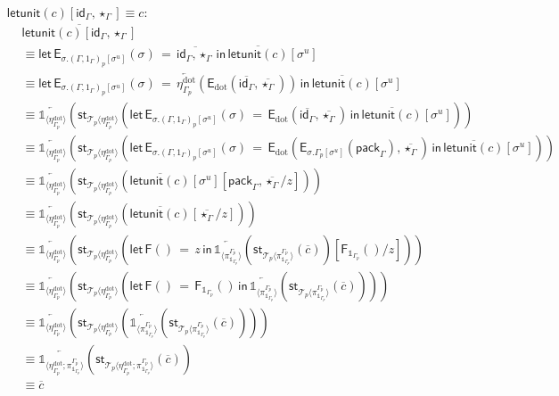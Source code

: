 \documentclass[10pt]{article}
\theoremstyle{definition}
\newcommand{\id}{\mathsf{id}}
\newcommand{\rewrite}[2]{\overleftarrow{#1}(#2)}
\newcommand\StI[2]{\ensuremath{\mathsf{st}_{#1}(#2)}}
\newcommand\FE[3]{\ensuremath{\mathsf{let} \, \mathsf{F}(#2) \, = \, {#1} \, \mathsf{in} \, #3}}
\newcommand\FIs[2]{\ensuremath{\mathsf{F}_{#1}{(#2)}}}
\newcommand\EEs[4]{\ensuremath{\mathsf{let} \, \mathsf{E}_{#1}(#3) \, = \, {#2} \, \mathsf{in} \, #4}}
\newcommand\EIs[2]{\ensuremath{\mathsf{E}_{#1}{(#2)}}}
\newcommand\ApEl[2]{\mathcal{T}_{#1}\langle#2\rangle}
\newcommand\pack[1]{\ensuremath{\mathsf{pack}_{#1}}}
\newcommand\unp[2]{\ensuremath{{#2}^u}}
\newcommand{\modeof}[1]{{#1}_p}
\newcommand{\sdot}{\ensuremath{\mathrm{dot}}}
\newcommand{\upstairs}[1]{\overline{#1}}
\newcommand\One{\ensuremath{\mathds{1}}}
\newcommand\ApOne[1]{\ensuremath{\One_{\langle {#1} \rangle }}}
\newcommand\qunitmatch[1]{\ensuremath{\mathsf{letunit}(#1)}}
\begin{document}
\begin{enumerate}[style = multiline, labelwidth = 80pt]
\item[{$\qunitmatch{c}[\id_\Gamma, \star_\Gamma] \equiv c$}:] 
\begin{align*}
&\upstairs{\qunitmatch{c}[\id_\Gamma, \star_\Gamma]} \\
&\equiv \EEs{\sigma.\modeof{(\Gamma, 1_\Gamma)}[\unp{\Gamma, 1_\Gamma}{\sigma}]}{\upstairs{\id_\Gamma, \star_\Gamma}}{\sigma}{\upstairs{\qunitmatch{c}}[\unp{\Gamma, 1_\Gamma}{\sigma}]} \\
&\equiv \EEs{\sigma.\modeof{(\Gamma, 1_\Gamma)}[\unp{\Gamma, 1_\Gamma}{\sigma}]}{\rewrite{\eta^\sdot_{\modeof{\Gamma}}}{\EIs{\sdot}{\upstairs{\id_\Gamma}, \upstairs{\star_\Gamma}}}}{\sigma}{\upstairs{\qunitmatch{c}}[\unp{\Gamma, 1_\Gamma}{\sigma}]} \\
&\equiv \rewrite{\ApOne{\eta^\sdot_{\modeof{\Gamma}}}}{\StI{\ApEl{p}{\eta^\sdot_{\modeof{\Gamma}}}}{\EEs{\sigma.\modeof{(\Gamma, 1_\Gamma)}[\unp{\Gamma, 1_\Gamma}{\sigma}]}{\EIs{\sdot}{\upstairs{\id_\Gamma}, \upstairs{\star_\Gamma}}}{\sigma}{\upstairs{\qunitmatch{c}}[\unp{\Gamma, 1_\Gamma}{\sigma}]}}} \\
&\equiv \rewrite{\ApOne{\eta^\sdot_{\modeof{\Gamma}}}}{\StI{\ApEl{p}{\eta^\sdot_{\modeof{\Gamma}}}}{\EEs{\sigma.\modeof{(\Gamma, 1_\Gamma)}[\unp{\Gamma, 1_\Gamma}{\sigma}]}{\EIs{\sdot}{\EIs{\sigma.\modeof{\Gamma}[\unp{\Gamma}{\sigma}]}{\pack{\Gamma}}, \upstairs{\star_\Gamma}}}{\sigma}{\upstairs{\qunitmatch{c}}[\unp{\Gamma, 1_\Gamma}{\sigma}]}}} \\
&\equiv \rewrite{\ApOne{\eta^\sdot_{\modeof{\Gamma}}}}{\StI{\ApEl{p}{\eta^\sdot_{\modeof{\Gamma}}}}{\upstairs{\qunitmatch{c}}[\unp{\Gamma, 1_\Gamma}{\sigma}][\pack{\Gamma}, \upstairs{\star_\Gamma}/z]}} \\
&\equiv \rewrite{\ApOne{\eta^\sdot_{\modeof{\Gamma}}}}{\StI{\ApEl{p}{\eta^\sdot_{\modeof{\Gamma}}}}{\upstairs{\qunitmatch{c}}[\upstairs{\star_\Gamma}/z]}} \\
&\equiv \rewrite{\ApOne{\eta^\sdot_{\modeof{\Gamma}}}}{\StI{\ApEl{p}{\eta^\sdot_{\modeof{\Gamma}}}}{\FE{z}{}{\rewrite{\ApOne{\pi^{\modeof{\Gamma}}_{\One_{\modeof{\Gamma}}}}}{\StI{\ApEl{p}{\pi^{\modeof{\Gamma}}_{\One_{\modeof{\Gamma}}}}}{\upstairs{c}}}}[\FIs{\One_{\modeof{\Gamma}}}{}/z]}} \\
&\equiv \rewrite{\ApOne{\eta^\sdot_{\modeof{\Gamma}}}}{\StI{\ApEl{p}{\eta^\sdot_{\modeof{\Gamma}}}}{\FE{\FIs{\One_{\modeof{\Gamma}}}{}}{}{\rewrite{\ApOne{\pi^{\modeof{\Gamma}}_{\One_{\modeof{\Gamma}}}}}{\StI{\ApEl{p}{\pi^{\modeof{\Gamma}}_{\One_{\modeof{\Gamma}}}}}{\upstairs{c}}}}}} \\
&\equiv \rewrite{\ApOne{\eta^\sdot_{\modeof{\Gamma}}}}{\StI{\ApEl{p}{\eta^\sdot_{\modeof{\Gamma}}}}{\rewrite{\ApOne{\pi^{\modeof{\Gamma}}_{\One_{\modeof{\Gamma}}}}}{\StI{\ApEl{p}{\pi^{\modeof{\Gamma}}_{\One_{\modeof{\Gamma}}}}}{\upstairs{c}}}}} \\
&\equiv \rewrite{\ApOne{\eta^\sdot_{\modeof{\Gamma}};\pi^{\modeof{\Gamma}}_{\One_{\modeof{\Gamma}}}}}{\StI{\ApEl{p}{\eta^\sdot_{\modeof{\Gamma}};\pi^{\modeof{\Gamma}}_{\One_{\modeof{\Gamma}}}}}{\upstairs{c}}} \\
&\equiv \upstairs{c}
\end{align*}
\end{enumerate}
\end{document}

